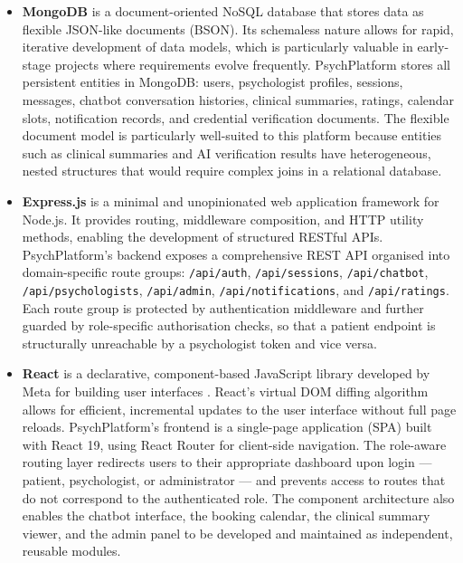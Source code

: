 \documentclass[a4paper,12pt]{report}
\begin{document}
\begin{itemize}[leftmargin=1.5em, itemsep=4pt]

  \item[--] \textbf{MongoDB} is a document-oriented NoSQL database that stores data as flexible JSON-like documents (BSON). Its schemaless nature allows for rapid, iterative development of data models, which is particularly valuable in early-stage projects where requirements evolve frequently. PsychPlatform stores all persistent entities in MongoDB: users, psychologist profiles, sessions, messages, chatbot conversation histories, clinical summaries, ratings, calendar slots, notification records, and credential verification documents. The flexible document model is particularly well-suited to this platform because entities such as clinical summaries and AI verification results have heterogeneous, nested structures that would require complex joins in a relational database.

  \item[--] \textbf{Express.js} is a minimal and unopinionated web application framework for Node.js. It provides routing, middleware composition, and HTTP utility methods, enabling the development of structured RESTful APIs. PsychPlatform's backend exposes a comprehensive REST API organised into domain-specific route groups: \texttt{/api/auth}, \texttt{/api/sessions}, \texttt{/api/chatbot}, \texttt{/api/psychologists}, \texttt{/api/admin}, \texttt{/api/notifications}, and \texttt{/api/ratings}. Each route group is protected by authentication middleware and further guarded by role-specific authorisation checks, so that a patient endpoint is structurally unreachable by a psychologist token and vice versa.

  \item[--] \textbf{React} is a declarative, component-based JavaScript library developed by Meta for building user interfaces \cite{Fedosejev2015}. React's virtual DOM diffing algorithm allows for efficient, incremental updates to the user interface without full page reloads. PsychPlatform's frontend is a single-page application (SPA) built with React 19, using React Router for client-side navigation. The role-aware routing layer redirects users to their appropriate dashboard upon login --- patient, psychologist, or administrator --- and prevents access to routes that do not correspond to the authenticated role. The component architecture also enables the chatbot interface, the booking calendar, the clinical summary viewer, and the admin panel to be developed and maintained as independent, reusable modules.


\end{itemize}
\end{document}

